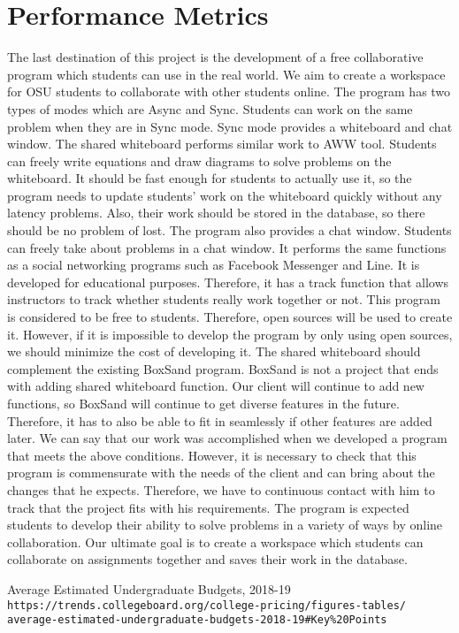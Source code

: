 \documentclass[onecolumn, draftclsnofoot,10pt, compsoc]{IEEEtran}
\begin{document}
\section{Performance Metrics}
The last destination of this project is the development of a free collaborative program which students can use in the real world. We aim to create a workspace for OSU students to collaborate with other students online. The program has two types of modes which are Async and Sync. Students can work on the same problem when they are in Sync mode. Sync mode provides a whiteboard and chat window. The shared whiteboard performs similar work to AWW tool. Students can freely write equations and draw diagrams to solve problems on the whiteboard. It should be fast enough for students to actually use it, so the program needs to update students’ work on the whiteboard quickly without any latency problems. Also, their work should be stored in the database, so there should be no problem of lost. The program also provides a chat window. Students can freely take about problems in a chat window. It performs the same functions as a social networking programs such as Facebook Messenger and Line. It is developed for educational purposes. Therefore, it has a track function that allows instructors to track whether students really work together or not. This program is considered to be free to students. Therefore, open sources will be used to create it. However, if it is impossible to develop the program by only using open sources, we should minimize the cost of developing it. The shared whiteboard should complement the existing BoxSand program. BoxSand is not a project that ends with adding shared whiteboard function. Our client will continue to add new functions, so BoxSand will continue to get diverse features in the future. Therefore, it has to also be able to fit in seamlessly if other features are added later. We can say that our work was accomplished when we developed a program that meets the above conditions. However, it is necessary to check that this program is commensurate with the needs of the client and can bring about the changes that he expects. Therefore, we have to continuous contact with him to track that the project fits with his requirements. The program is expected students to develop their ability to solve problems in a variety of ways by online collaboration. Our ultimate goal is to create a workspace which students can collaborate on assignments together and saves their work in the database.

\begin{thebibliography}{9}
	Average Estimated Undergraduate Budgets, 2018-19
	\\\texttt{https://trends.collegeboard.org/college-pricing/figures-tables/}
	\\\texttt{average-estimated-undergraduate-budgets-2018-19\#Key\%20Points}
\end{thebibliography}
\end{document}

